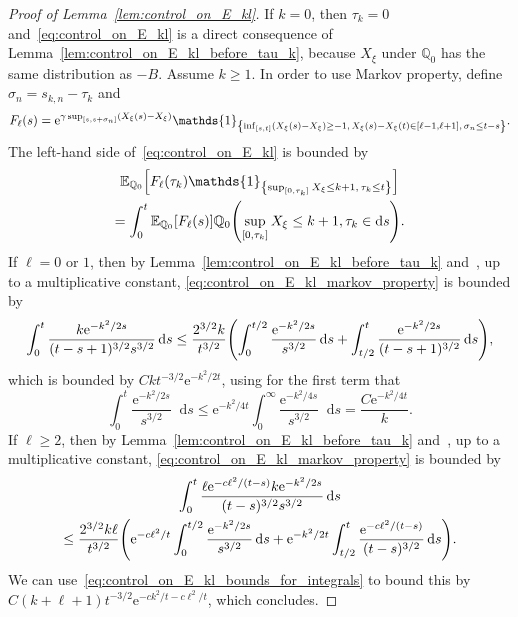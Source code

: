 \documentclass[AHL,Unicode,longabstracts,published]{cedram}
\newcommand{\e}{\mathrm{e}}
\renewcommand{\d}[1]{\mathop{}\!\mathrm{d}#1}
\newcommand{\E}{\mathbb{E}}
\newcommand{\Q}{\mathbb{Q}}
\newcommand\1{\mathds{1}}
\newcommand*{\MK}{\mkern 2mu}
\let\originalleft\left
\let\originalright\right
\renewcommand{\left}{\mathopen{}\mathclose\bgroup\originalleft}
\renewcommand{\right}{\aftergroup\egroup\originalright}
\begin{document}
\begin{proof}[Proof of Lemma~\ref{lem:control_on_E_kl}]
If $k = 0$, then $\tau_k = 0$ and~\eqref{eq:control_on_E_kl} is a direct consequence of Lemma~\ref{lem:control_on_E_kl_before_tau_k}, because $X_\xi$ under $\Q_0$ has the same distribution as $-B$. Assume $k \geq 1$. In order to use Markov property, define $\sigma_n = s_{k, n} - \tau_k$ and
\begin{equation*}
F_{\ell}(s) = \e^{\gamma \sup_{[s, s + \sigma_n]} \left(X_\xi(s) - X_\xi\right)} \1_{\left\{\inf_{[s, t]} (X_\xi(s) - X_\xi) \geq -1,\, X_\xi(s) - X_\xi(t) \in [\ell - 1, \ell + 1],\, \sigma_n \leq t - s\right\}}.
\end{equation*}
The left-hand side of~\eqref{eq:control_on_E_kl} is bounded by
\begin{multline}\label{eq:control_on_E_kl_markov_property}
\E_{\Q_0} \left[F_{\ell}(\tau_k) \1_{\left\{\sup_{[0, \tau_k]} X_\xi \leq k + 1,\, \tau_k \leq t\right\}} \right] \\
= \int_0^t \E_{\Q_0} \left[F_{\ell}(s) \right] \Q_0 \left(\sup_{[0, \tau_k]} X_\xi \leq k + 1, \tau_k \in \d{s} \right).
\end{multline}
If $\ell = 0$ or $1$, then by Lemma~\ref{lem:control_on_E_kl_before_tau_k} and~\cite[Formula~1.2.1.4$\MK$(1)]{BorodinSalminen2002}, up to a multiplicative constant, \eqref{eq:control_on_E_kl_markov_property} is bounded by
\begin{equation*}
\int_0^t \frac{k \e^{-k^2/2s}}{(t - s + 1)^{3/2} s^{3/2}} \d{s} \leq \frac{2^{3/2} k}{t^{3/2}} \left(\int_0^{t/2} \frac{\e^{-k^2/2s}}{s^{3/2}} \d{s} + \int_{t/2}^t \frac{\e^{-k^2/2s}}{(t - s + 1)^{3/2}} \d{s} \right),
\end{equation*}
which is bounded by $C k t^{-3/2} \e^{-k^2/2t}$, using for the first term that
\begin{equation}\label{eq:control_on_E_kl_bounds_for_integrals}
\int_0^{t} \frac{\e^{-k^2/2s}}{s^{3/2}} \d{s}
\leq \e^{-k^2/4t} \int_0^\infty \frac{\e^{-k^2/4s}}{s^{3/2}} \d{s} = \frac{C \e^{-k^2/4t}}{k}.
\end{equation}
If $ \ell \geq 2$, then by Lemma~\ref{lem:control_on_E_kl_before_tau_k} and~\cite[Formula~1.2.1.4$\MK$(1)]{BorodinSalminen2002}, up to a multiplicative constant, \eqref{eq:control_on_E_kl_markov_property} is bounded by
\begin{multline*}
\int_0^t \frac{\ell \e^{-c \ell^2/(t-s)} k \e^{-k^2/2s}}{(t-s)^{3/2} s^{3/2}} \d{s} \\
\leq \frac{2^{3/2} k \ell}{t^{3/2}} \left(\e^{-c \ell^2/t} \int_0^{t/2} \frac{\e^{-k^2/2s}}{s^{3/2}} \d{s} + \e^{-k^2/2t} \int_{t/2}^t \frac{\e^{-c \ell^2/(t-s)}}{(t - s)^{3/2}} \d{s} \right).
\end{multline*}
We can use~\eqref{eq:control_on_E_kl_bounds_for_integrals} to bound this by $C (k + \ell + 1) t^{-3/2} \e^{-c k^2/t - c \ell^2/t}$, which concludes.
\end{proof}
\end{document}
